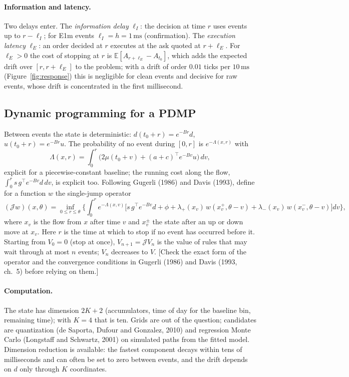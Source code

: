 \documentclass[11pt]{article}
\theoremstyle{definition}
\theoremstyle{remark}
\newcommand{\Em}{\textsf{E1m}}
\newcommand{\ms}{\,\text{ms}}
\newcommand{\E}{\mathbb{E}}
\newcommand{\todo}[1]{\textcolor{red!70!black}{[#1]}}
\begin{document}
\paragraph{Information and latency.} Two delays enter. The \emph{information delay} $\ell_I$: the decision at time $r$ uses events up to $r - \ell_I$; for \Em{} events $\ell_I = h = 1\ms$ (confirmation). The \emph{execution latency} $\ell_E$: an order decided at $r$ executes at the ask quoted at $r + \ell_E$. For $\ell_E > 0$ the cost of stopping at $r$ is $\E[A_{r + \ell_E} - A_{t_0}]$, which adds the expected drift over $[r, r + \ell_E]$ to the problem; with a drift of order $0.01$ ticks per $10\ms$ (Figure~\ref{fig:response}) this is negligible for clean events and decisive for raw events, whose drift is concentrated in the first millisecond.

\subsection{Dynamic programming for a PDMP}
\label{sec:stopping-pdmp}

Between events the state is deterministic: $d(t_0 + r) = e^{-Br} d$, $u(t_0 + r) = e^{-Br} u$. The probability of no event during $[0, r]$ is $e^{-\Lambda(x, r)}$ with
\[
\Lambda(x, r) = \int_0^r \big(2\mu(t_0 + v) + (a + c)^\top e^{-Bv} u\big)\,dv ,
\]
explicit for a piecewise-constant baseline; the running cost along the flow, $\int_0^r s\, g^\top e^{-Bv} d\,dv$, is explicit too. Following Gugerli (1986) and Davis (1993), define for a function $w$ the single-jump operator
\[
(\mathcal J w)(x, \theta) = \inf_{0 \le r \le \theta} \Big\{ \int_0^{r} e^{-\Lambda(x, v)} \Big[ s\, g^\top e^{-Bv} d + \phi + \lambda_+(x_v)\, w(x_v^+, \theta - v) + \lambda_-(x_v)\, w(x_v^-, \theta - v) \Big] dv \Big\},
\]
where $x_v$ is the flow from $x$ after time $v$ and $x_v^\pm$ the state after an up or down move at $x_v$. Here $r$ is the time at which to stop if no event has occurred before it. Starting from $V_0 = 0$ (stop at once), $V_{n+1} = \mathcal J V_n$ is the value of rules that may wait through at most $n$ events; $V_n$ decreases to $V$. \todo{Check the exact form of the operator and the convergence conditions in Gugerli (1986) and Davis (1993, ch.~5) before relying on them.}

\paragraph{Computation.} The state has dimension $2K + 2$ (accumulators, time of day for the baseline bin, remaining time); with $K = 4$ that is ten. Grids are out of the question; candidates are quantization (de Saporta, Dufour and Gonzalez, 2010) and regression Monte Carlo (Longstaff and Schwartz, 2001) on simulated paths from the fitted model. Dimension reduction is available: the fastest component decays within tens of milliseconds and can often be set to zero between events, and the drift depends on $d$ only through $K$ coordinates.
\end{document}
